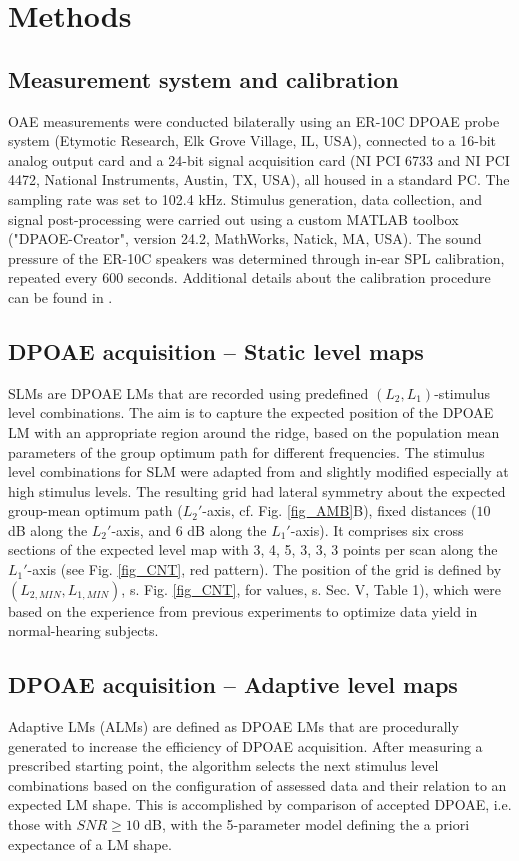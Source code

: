 \documentclass[journal,twoside,web]{ieeecolor2}
\begin{document}
\section{Methods}
\subsection{Measurement system and calibration}
OAE measurements were conducted bilaterally using an ER-10C DPOAE probe system (Etymotic Research, Elk Grove Village, IL, USA), connected to a 16-bit analog output card and a 24-bit signal acquisition card (NI PCI 6733 and NI PCI 4472, National Instruments, Austin, TX, USA), all housed in a standard PC.
The sampling rate was set to 102.4 kHz.
Stimulus generation, data collection, and signal post-processing were carried out using a custom MATLAB toolbox ("DPAOE-Creator", version 24.2, MathWorks, Natick, MA, USA).
The sound pressure of the ER-10C speakers was determined through in-ear SPL calibration, repeated every 600 seconds.
Additional details about the calibration procedure can be found in \cite{ZD2015a}.

\subsection{DPOAE acquisition – Static level maps}
SLMs are DPOAE LMs that are recorded using predefined $(L_2, L_1)$-stimulus level combinations.
The aim is to capture the expected position of the DPOAE LM with an appropriate region around the ridge, based on the population mean parameters of the group optimum path for different frequencies.
The stimulus level combinations for SLM were adapted from \cite{ZD2020} and slightly modified especially at high stimulus levels.
The resulting grid had lateral symmetry about the expected group-mean optimum path ($L_2'$-axis, cf. Fig. \ref{fig_AMB}B), fixed distances ($10$ dB along the $L_2'$-axis, and $6$ dB along the $L_1'$-axis).
It comprises six cross sections of the expected level map with 3, 4, 5, 3, 3, 3 points per scan along the $L_1'$-axis (see Fig. \ref{fig_CNT}, red pattern).
The position of the grid is defined by $(L_{2,MIN} , L_{1,MIN})$, s. Fig. \ref{fig_CNT}, for values,  s. Sec. V, Table 1), which were based on the experience from previous experiments \cite{Br2021} to optimize data yield in normal-hearing subjects.

\subsection{DPOAE acquisition – Adaptive level maps}
Adaptive LMs (ALMs) are defined as DPOAE LMs that are procedurally generated to increase the efficiency of DPOAE acquisition.
After measuring a prescribed starting point, the algorithm selects the next stimulus level combinations based on the configuration of assessed data and their relation to an expected LM shape.
This is accomplished by comparison of accepted DPOAE, i.e. those with $SNR \ge 10$ dB, with the 5-parameter model defining the a priori expectance of a LM shape.
\end{document}
